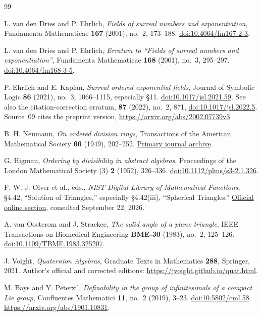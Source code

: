 \documentclass[11pt,letterpaper]{article}
\numberwithin{equation}{section}
\theoremstyle{definition}
\theoremstyle{remark}
\begin{document}
\begin{thebibliography}{99}
\raggedright

L. van den Dries and P. Ehrlich,
\emph{Fields of surreal numbers and exponentiation},
Fundamenta Mathematicae \textbf{167} (2001), no.~2, 173--188.
\href{https://doi.org/10.4064/fm167-2-3}{doi:10.4064/fm167-2-3}.

L. van den Dries and P. Ehrlich,
\emph{Erratum to ``Fields of surreal numbers and exponentiation''},
Fundamenta Mathematicae \textbf{168} (2001), no.~3, 295--297.
\href{https://doi.org/10.4064/fm168-3-5}{doi:10.4064/fm168-3-5}.

P. Ehrlich and E. Kaplan,
\emph{Surreal ordered exponential fields},
Journal of Symbolic Logic \textbf{86} (2021), no.~3, 1066--1115,
especially \S11.
\href{https://doi.org/10.1017/jsl.2021.59}{doi:10.1017/jsl.2021.59}.
See also the citation-correction erratum, \textbf{87} (2022), no.~2, 871,
\href{https://doi.org/10.1017/jsl.2022.5}{doi:10.1017/jsl.2022.5}.
Source~09 cites the preprint version,
\url{https://arxiv.org/abs/2002.07739v3}.

B. H. Neumann,
\emph{On ordered division rings},
Transactions of the American Mathematical Society \textbf{66} (1949),
202--252.
\href{https://www.jstor.org/stable/1990552}{Primary journal archive}.

G. Higman,
\emph{Ordering by divisibility in abstract algebras},
Proceedings of the London Mathematical Society (3) \textbf{2} (1952), 326--336.
\href{https://doi.org/10.1112/plms/s3-2.1.326}{doi:10.1112/plms/s3-2.1.326}.

F. W. J. Olver et al., eds.,
\emph{NIST Digital Library of Mathematical Functions},
\S4.42, ``Solution of Triangles,'' especially \S4.42(iii),
``Spherical Triangles.''
\href{https://dlmf.nist.gov/4.42}{Official online section},
consulted September 22, 2026.

A. van Oosterom and J. Strackee,
\emph{The solid angle of a plane triangle},
IEEE Transactions on Biomedical Engineering \textbf{BME-30} (1983),
no.~2, 125--126.
\href{https://doi.org/10.1109/TBME.1983.325207}{doi:10.1109/TBME.1983.325207}.

J. Voight,
\emph{Quaternion Algebras},
Graduate Texts in Mathematics \textbf{288}, Springer, 2021.
Author's official and corrected editions:
\url{https://jvoight.github.io/quat.html}.

M. Bays and Y. Peterzil,
\emph{Definability in the group of infinitesimals of a compact Lie group},
Confluentes Mathematici \textbf{11}, no.~2 (2019), 3--23.
\href{https://doi.org/10.5802/cml.58}{doi:10.5802/cml.58}.
\url{https://arxiv.org/abs/1901.10831}.


\end{thebibliography}
\end{document}
